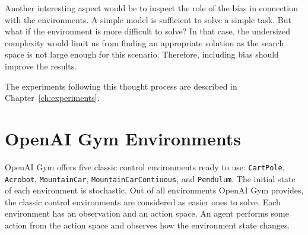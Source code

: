 Another interesting aspect would be to inspect the role of the bias in connection with the environments. A simple model is sufficient to solve a simple task. But what if the environment is more difficult to solve? In that case, the undersized complexity would limit us from finding an appropriate solution as the search space is not large enough for this scenario. Therefore, including bias should improve the results.

The experiments following this thought process are described in Chapter~\ref{ch:experiments}.



\section{OpenAI Gym Environments}
\label{sec:environments}
OpenAI Gym offers five classic control environments ready to use: \verb|CartPole|, \verb|Acrobot|, \verb|MountainCar|, \verb|MountainCarContiuous|, and \verb|Pendulum|. The initial state of each environment is stochastic. Out of all environments OpenAI Gym provides, the classic control environments are considered as easier ones to solve. Each environment has an observation and an action space. An agent performs some action from the action space and observes how the environment state changes.

